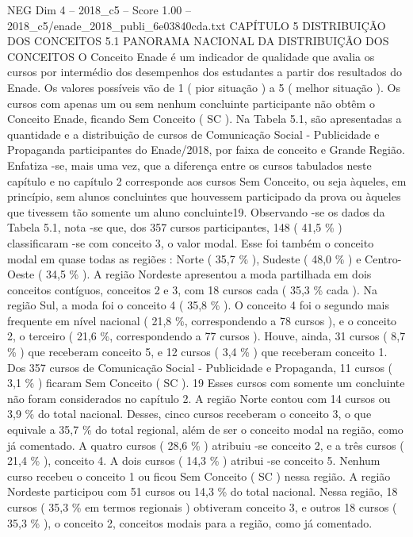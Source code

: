 \begin{textsample}{NEG Dim 4 – 2018\_c5 – Score 1.00 – 2018\_c5/enade\_2018\_publi\_6e03840cda.txt}  \label{ex:f4_neg_137}
CAPÍTULO 5 DISTRIBUIÇÃO DOS CONCEITOS 5.1 PANORAMA NACIONAL DA DISTRIBUIÇÃO DOS CONCEITOS O Conceito Enade é um indicador de qualidade que avalia os cursos por intermédio dos desempenhos dos estudantes a partir dos resultados do Enade.
Os valores possíveis vão de 1 ( pior situação ) a 5 ( melhor situação ).
Os cursos com apenas um ou sem nenhum concluinte participante não obtêm o Conceito Enade, ficando Sem Conceito ( SC ).
Na Tabela 5.1, são apresentadas a quantidade e a distribuição de cursos de Comunicação Social - Publicidade e Propaganda participantes do Enade/2018, por faixa de conceito e Grande Região.
Enfatiza -se, mais uma vez, que a diferença entre os cursos tabulados neste capítulo e no capítulo 2 corresponde aos cursos Sem Conceito, ou seja àqueles, em princípio, sem alunos concluintes que houvessem participado da prova ou àqueles que tivessem tão somente um aluno concluinte19.
Observando -se os dados da Tabela 5.1, nota -se que, dos 357 cursos participantes, 148 ( 41,5 \% ) classificaram -se com conceito 3, o valor modal.
Esse foi também o conceito modal em quase todas as regiões : Norte ( 35,7 \% ), Sudeste ( 48,0 \% ) e Centro-Oeste ( 34,5 \% ).
A região Nordeste apresentou a moda partilhada em dois conceitos contíguos, conceitos 2 e 3, com 18 cursos cada ( 35,3 \% cada ).
Na região Sul, a moda foi o conceito 4 ( 35,8 \% ).
O conceito 4 foi o segundo mais frequente em nível nacional ( 21,8 \%, correspondendo a 78 cursos ), e o conceito 2, o terceiro ( 21,6 \%, correspondendo a 77 cursos ).
Houve, ainda, 31 cursos ( 8,7 \% ) que receberam conceito 5, e 12 cursos ( 3,4 \% ) que receberam conceito 1.
Dos 357 cursos de Comunicação Social - Publicidade e Propaganda, 11 cursos ( 3,1 \% ) ficaram Sem Conceito ( SC ). 19 Esses cursos com somente um concluinte não foram considerados no capítulo 2.
A região Norte contou com 14 cursos ou 3,9 \% do total nacional.
Desses, cinco cursos receberam o conceito 3, o que equivale a 35,7 \% do total regional, além de ser o conceito modal na região, como já comentado.
A quatro cursos ( 28,6 \% ) atribuiu -se conceito 2, e a três cursos ( 21,4 \% ), conceito 4.
A dois cursos ( 14,3 \% ) atribui -se conceito 5.
Nenhum curso recebeu o conceito 1 ou ficou Sem Conceito ( SC ) nessa região.
A região Nordeste participou com 51 cursos ou 14,3 \% do total nacional.
Nessa região, 18 cursos ( 35,3 \% em termos regionais ) obtiveram conceito 3, e outros 18 cursos ( 35,3 \% ), o conceito 2, conceitos modais para a região, como já comentado.

\end{textsample}
